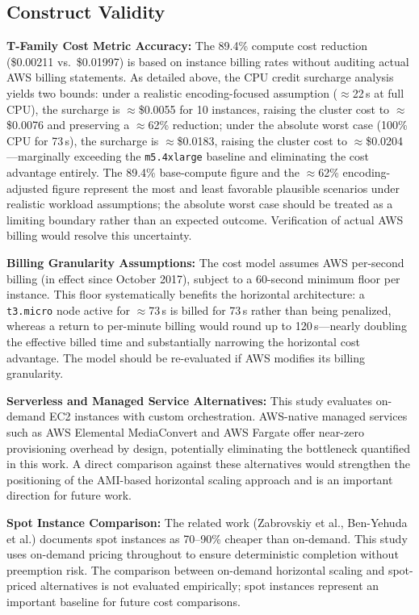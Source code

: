 \documentclass[conference]{IEEEtran}
\begin{document}
\subsection{Construct Validity}

\textbf{T-Family Cost Metric Accuracy:} The 89.4\% compute cost reduction (\$0.00211 vs.\ \$0.01997) is based on instance billing rates without auditing actual AWS billing statements. As detailed above, the CPU credit surcharge analysis yields two bounds: under a realistic encoding-focused assumption ($\approx$22\,s at full CPU), the surcharge is $\approx$\$0.0055 for 10 instances, raising the cluster cost to $\approx$\$0.0076 and preserving a $\approx$62\% reduction; under the absolute worst case (100\% CPU for 73\,s), the surcharge is $\approx$\$0.0183, raising the cluster cost to $\approx$\$0.0204---marginally exceeding the \texttt{m5.4xlarge} baseline and eliminating the cost advantage entirely. The 89.4\% base-compute figure and the $\approx$62\% encoding-adjusted figure represent the most and least favorable plausible scenarios under realistic workload assumptions; the absolute worst case should be treated as a limiting boundary rather than an expected outcome. Verification of actual AWS billing would resolve this uncertainty.

\textbf{Billing Granularity Assumptions:} The cost model assumes AWS per-second billing (in effect since October 2017), subject to a 60-second minimum floor per instance. This floor systematically benefits the horizontal architecture: a \texttt{t3.micro} node active for $\approx$73\,s is billed for 73\,s rather than being penalized, whereas a return to per-minute billing would round up to 120\,s---nearly doubling the effective billed time and substantially narrowing the horizontal cost advantage. The model should be re-evaluated if AWS modifies its billing granularity.

\textbf{Serverless and Managed Service Alternatives:} This study evaluates on-demand EC2 instances with custom orchestration. AWS-native managed services such as AWS Elemental MediaConvert and AWS Fargate offer near-zero provisioning overhead by design, potentially eliminating the bottleneck quantified in this work. A direct comparison against these alternatives would strengthen the positioning of the AMI-based horizontal scaling approach and is an important direction for future work.

\textbf{Spot Instance Comparison:} The related work (Zabrovskiy et al., Ben-Yehuda et al.) documents spot instances as 70--90\% cheaper than on-demand. This study uses on-demand pricing throughout to ensure deterministic completion without preemption risk. The comparison between on-demand horizontal scaling and spot-priced alternatives is not evaluated empirically; spot instances represent an important baseline for future cost comparisons.
\end{document}
